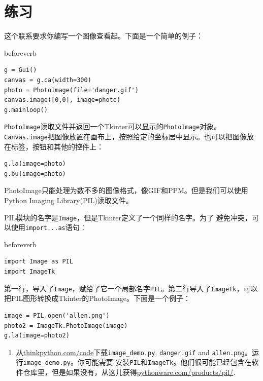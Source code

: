 \section{练习}

\begin{ex}


这个联系要求你编写一个图像查看起。下面是一个简单的例子：

beforeverb
\begin{verbatim}
g = Gui()
canvas = g.ca(width=300)
photo = PhotoImage(file='danger.gif')
canvas.image([0,0], image=photo)
g.mainloop()
\end{verbatim}
\afterverb

{\tt PhotoImage}读取文件并返回一个Tkinter可以显示的{\tt PhotoImage}对象。{\tt Canvas.image}把图像放置在画布上，按照给定的坐标居中显示。也可以把图像放在标签，按钮和其他的控件上：

\beforeverb
\begin{verbatim}
g.la(image=photo)
g.bu(image=photo)
\end{verbatim}
\afterverb
%

PhotoImage只能处理为数不多的图像格式，像GIF和PPM。但是我们可以使用Python Imaging Library(PIL)读取文件。


PIL模块的名字是{\tt Image}，但是Tkinter定义了一个同样的名字。为了
避免冲突，可以使用{\tt import...as}语句：

beforeverb
\begin{verbatim}
import Image as PIL
import ImageTk
\end{verbatim}
\afterverb
%

第一行，导入了{\tt Image}，赋给了它一个局部名字{\tt PIL}。第二行导入了{\tt ImageTk}，可以把PIL图形转换成Tkinter的PhotoImage。下面是一个例子：

\beforeverb
\begin{verbatim}
image = PIL.open('allen.png')
photo2 = ImageTk.PhotoImage(image)
g.la(image=photo2)
\end{verbatim}
\afterverb
%

\begin{enumerate}

\item 从\url{thinkpython.com/code}下载\verb"image_demo.py", \verb"danger.gif" and \verb"allen.png"。运行\verb"image_demo.py"。你可能需要
安装{\tt PIL}和{\tt ImageTk}。他们很可能已经包含在软件仓库里，但是如果没有，从这儿获得\url{pythonware.com/products/pil/}.


\end{enumerate}
\end{ex}
